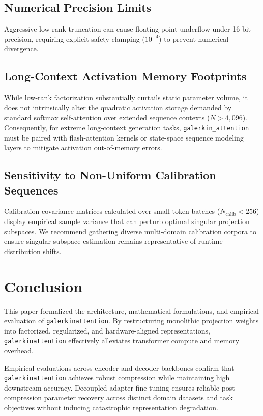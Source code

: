 \subsection{Numerical Precision Limits}
Aggressive low-rank truncation can cause floating-point underflow under 16-bit precision, requiring explicit safety clamping ($10^{-4}$) to prevent numerical divergence.

\subsection{Long-Context Activation Memory Footprints}
While low-rank factorization substantially curtails static parameter volume, it does not intrinsically alter the quadratic activation storage demanded by standard softmax self-attention over extended sequence contexts ($N > 4{,}096$). Consequently, for extreme long-context generation tasks, \texttt{galerkin\_attention} must be paired with flash-attention kernels or state-space sequence modeling layers to mitigate activation out-of-memory errors.

\subsection{Sensitivity to Non-Uniform Calibration Sequences}
Calibration covariance matrices calculated over small token batches ($N_{\text{calib}} < 256$) display empirical sample variance that can perturb optimal singular projection subspaces. We recommend gathering diverse multi-domain calibration corpora to ensure singular subspace estimation remains representative of runtime distribution shifts.


\section{Conclusion}
This paper formalized the architecture, mathematical formulations, and empirical evaluation of \texttt{galerkinattention}. By restructuring monolithic projection weights into factorized, regularized, and hardware-aligned representations, \texttt{galerkinattention} effectively alleviates transformer compute and memory overhead.

Empirical evaluations across encoder and decoder backbones confirm that \texttt{galerkinattention} achieves robust compression while maintaining high downstream accuracy. Decoupled adapter fine-tuning ensures reliable post-compression parameter recovery across distinct domain datasets and task objectives without inducing catastrophic representation degradation.

